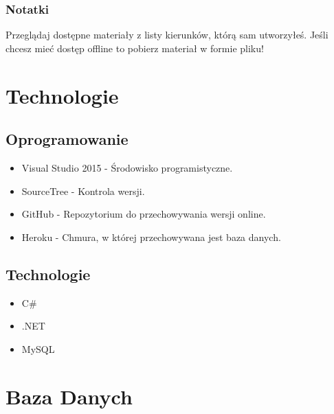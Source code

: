 \documentclass[12pt,a4paper]{article}
\begin{document}
			\subsubsection{Notatki}
				Przeglądaj dostępne materiały z listy kierunków, którą sam utworzyłeś. Jeśli chcesz mieć dostęp offline to pobierz materiał w formie pliku!
	\section{Technologie}
			\subsection{Oprogramowanie}
			\begin{itemize}
			\item Visual Studio 2015 - Środowisko programistyczne.
			\item SourceTree - Kontrola wersji.
			\item GitHub - Repozytorium do przechowywania wersji online.
			\item Heroku - Chmura, w której przechowywana jest baza danych.
			\end{itemize}
			\subsection{Technologie}
			\begin{itemize}
			\item C\#
			\item .NET
			\item MySQL
			\end{itemize}
	\section{Baza Danych}
\end{document}
